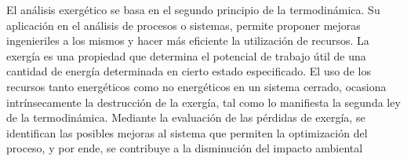 \documentclass[12pt, twoside]{report}
\begin{document}
El análisis exergético se basa en el segundo principio de la termodinámica. Su aplicación en  el  análisis  de  procesos  o  sistemas,  permite proponer  mejoras  ingenieriles  a  los  mismos  y hacer más eficiente la utilización de recursos. La exergía es una propiedad que determina el  potencial  de  trabajo  útil  de  una  cantidad  de  energía  determinada  en  cierto  estado especificado. El uso de los recursos tanto energéticos como no energéticos en un sistema cerrado, ocasiona intrínsecamente la destrucción de la exergía, tal como lo manifiesta la  segunda  ley  de  la  termodinámica.  Mediante  la  evaluación  de  las  pérdidas  de  exergía,  se  identifican  las  posibles mejoras  al  sistema que  permiten  la  optimización del  proceso,  y  por ende, se contribuye a la disminución del impacto ambiental





\end{document}

